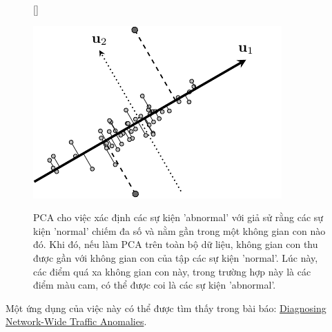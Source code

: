\begin{figure}[t]
    [\FBwidth]
    {\caption{ 
    PCA cho việc xác định các sự kiện 'abnormal' với giả sử rằng các sự kiện 'normal' chiếm đa số và nằm gần trong một không gian con nào đó. Khi đó, nếu làm PCA trên toàn bộ dữ liệu, không gian con thu được gần với không gian con của tập các sự kiện 'normal'. Lúc này, các điểm quá xa không gian con này, trong trường hợp này là các điểm màu cam, có thể được coi là các sự kiện 'abnormal'.
    }
    \label{fig:28_4}}
    { %
    \includegraphics[width=.5\textwidth]{Chapters/07_DimemsionalityReduction/28_pca2/latex/abnormal.pdf}
    }
\end{figure}

 
Một ứng dụng của việc này có thể được tìm thấy trong bài báo: \href{http://www.cs.bu.edu/fac/crovella/paper-archive/sigc04-network-wide-anomalies.pdf}{Diagnosing Network-Wide Traffic Anomalies}. 
 
 
